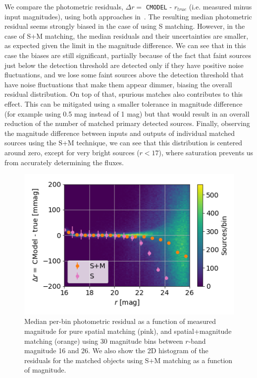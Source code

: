 \documentclass[a4paper,fleqn,usenatbib]{mnras}
\begin{document}
We compare the photometric residuals, $\Delta r = $ \texttt{CMODEL} - $r_{true}$ (i.e. measured minus input magnitudes), using both approaches in~. The resulting median photometric residual seems strongly biased in the case of using \textsf{S} matching. However, in the case of \textsf{S+M} matching, the median residuals and their uncertainties are smaller, as expected given the limit in the magnitude difference. We can see that in this case the biases are still significant, partially because of the fact that faint sources just below the detection threshold are detected only if they have positive noise fluctuations, and we lose some faint sources above the detection threshold that have noise fluctuations that make them appear dimmer, biasing the overall residual distribution. On top of that, spurious matches also contributes to this effect. This can be mitigated using a smaller tolerance in magnitude difference (for example using 0.5 mag instead of 1 mag) but that would result in an overall reduction of the number of matched primary detected sources. Finally, observing the magnitude difference between inputs and outputs of individual matched sources using the \textsf{S+M} technique, we can see that this distribution is centered around zero, except for very bright sources ($r < 17$), where saturation prevents us from accurately determining the fluxes. 

\begin{figure}
\centering
\includegraphics[width=0.85\columnwidth]{photometry_residual_comparison}
\caption{Median per-bin photometric residual as a function of measured magnitude for pure spatial matching (pink), and spatial+magnitude matching (orange) using 30 magnitude bins between $r$-band magnitude 16 and 26. We also show the 2D histogram of the residuals for the matched objects using \textsf{S+M} matching as a function of magnitude.}
\label{fig:matching_comparison}
\end{figure}
\end{document}
